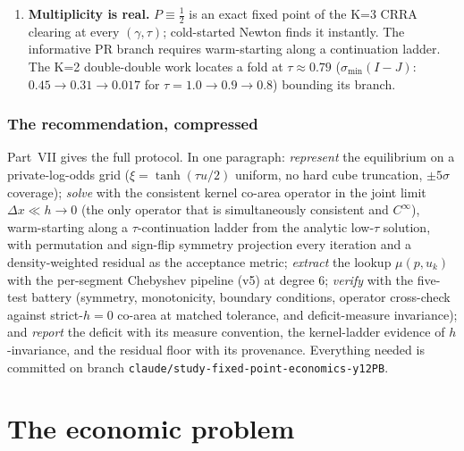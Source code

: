 \documentclass[11pt]{report}
\newcommand{\strict}{strict-$h{=}0$}
\begin{document}
\begin{enumerate}
        Morse-critical prices (proven on a controlled saddle: $A_v'(p)$
        blows up $128\times$ while the kernel-band derivative stays
        bounded). Newton needs $C^1$. Smoothed indicators introduce
        bias with no sweet spot; Newton--Krylov, MINPACK HYBRD, and
        frozen-cusp variants all plateau at the same
        $\sim 10^{-2}$ wall on $G = 11$ at high $\tau$. The fix is
        resolution + consistent kernel (the joint central-path limit),
        not solver engineering.
  \item \textbf{Multiplicity is real.} $P \equiv \tfrac12$ is an exact
        fixed point of the K=3 CRRA clearing at every $(\gamma, \tau)$;
        cold-started Newton finds it instantly. The informative PR
        branch requires warm-starting along a continuation ladder. The
        K=2 double-double work locates a fold at $\tau \approx 0.79$
        ($\sigma_{\min}(I - J)$: $0.45 \to 0.31 \to 0.017$ for
        $\tau = 1.0 \to 0.9 \to 0.8$) bounding its branch.
\end{enumerate}

\section*{The recommendation, compressed}
Part~VII gives the full protocol. In one paragraph: \emph{represent} the
equilibrium on a private-log-odds grid ($\xi = \tanh(\tau u/2)$ uniform,
no hard cube truncation, $\pm 5\sigma$ coverage); \emph{solve} with the
consistent kernel co-area operator in the joint limit
$\Delta x \ll h \to 0$ (the only operator that is simultaneously
consistent and $C^\infty$), warm-starting along a $\tau$-continuation
ladder from the analytic low-$\tau$ solution, with permutation and
sign-flip symmetry projection every iteration and a density-weighted
residual as the acceptance metric; \emph{extract} the lookup
$\mu(p, u_k)$ with the per-segment Chebyshev pipeline (v5) at degree 6;
\emph{verify} with the five-test battery (symmetry, monotonicity,
boundary conditions, operator cross-check against \strict{} co-area at
matched tolerance, and deficit-measure invariance); and \emph{report}
the deficit with its measure convention, the kernel-ladder evidence of
$h$-invariance, and the residual floor with its provenance. Everything
needed is committed on branch
\texttt{claude/study-fixed-point-economics-y12PB}.

\part{The economic problem}
\end{document}
